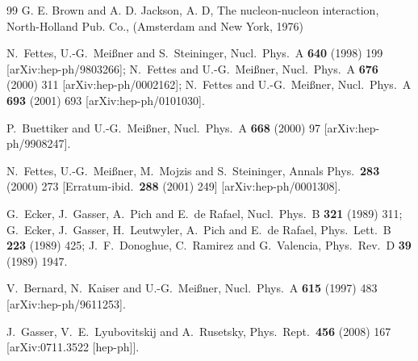 \documentclass[a4paper,fleqn]{scrartcl}
\begin{document}
{\begin{thebibliography}{99}
G. E. Brown and A. D. Jackson, A. D, 
 The nucleon-nucleon interaction, North-Holland Pub. Co.,
(Amsterdam and  New York,  1976)

  N.~Fettes, U.-G.~Mei\ss ner and S.~Steininger,
  Nucl.\ Phys.\  A {\bf 640} (1998) 199
  [arXiv:hep-ph/9803266];
  N.~Fettes and U.-G.~Mei\ss ner,
  Nucl.\ Phys.\  A {\bf 676} (2000) 311
  [arXiv:hep-ph/0002162];
  N.~Fettes and U.-G.~Mei\ss ner,
  Nucl.\ Phys.\  A {\bf 693} (2001) 693
  [arXiv:hep-ph/0101030].

  P.~Buettiker and U.-G.~Mei\ss ner,
  Nucl.\ Phys.\  A {\bf 668} (2000) 97
  [arXiv:hep-ph/9908247].


  N.~Fettes, U.-G.~Mei\ss ner, M.~Mojzis and S.~Steininger,
  Annals Phys.\  {\bf 283} (2000) 273
  [Erratum-ibid.\  {\bf 288} (2001) 249]
  [arXiv:hep-ph/0001308].

G.~Ecker, J.~Gasser, A.~Pich and E.~de Rafael,
  Nucl.\ Phys.\  B {\bf 321} (1989) 311;
G.~Ecker, J.~Gasser, H.~Leutwyler, A.~Pich and E.~de Rafael,
  Phys.\ Lett.\  B {\bf 223} (1989) 425;
J.~F.~Donoghue, C.~Ramirez and G.~Valencia,
  Phys.\ Rev.\  D {\bf 39} (1989) 1947.

  V.~Bernard, N.~Kaiser and U.-G.~Mei\ss ner,
  Nucl.\ Phys.\  A {\bf 615} (1997) 483
  [arXiv:hep-ph/9611253].


  J.~Gasser, V.~E.~Lyubovitskij and A.~Rusetsky,
  Phys.\ Rept.\  {\bf 456} (2008) 167
  [arXiv:0711.3522 [hep-ph]].


\end{thebibliography}}
\end{document}
